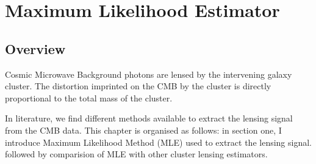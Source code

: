 \chapter{Maximum Likelihood Estimator}
\label{ch:MLE}
\section{Overview}
Cosmic Microwave Background photons are lensed by the intervening galaxy cluster. 
The distortion imprinted on the CMB by the cluster is directly proportional to the total mass of the cluster.

In literature, we find different methods available to extract the lensing signal from the CMB data.
This chapter is organised as follows: in section one, I introduce Maximum Likelihood Method (MLE) used to extract the lensing signal.
followed by comparision of MLE with other cluster lensing estimators. 
  
